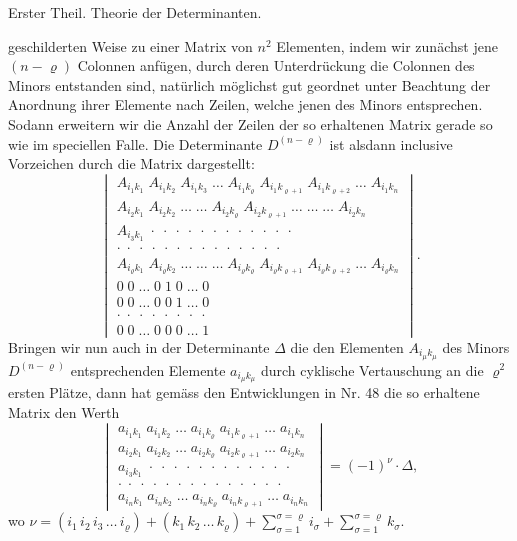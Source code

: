 Erster Theil. Theorie der Determinanten.

geschilderten Weise zu einer Matrix von $n^2$ Elementen, indem wir zunächst jene $(n-\varrho)$ Colonnen anfügen, durch deren Unterdrückung die Colonnen des Minors entstanden sind, natürlich möglichst gut geordnet unter Beachtung der Anordnung ihrer Elemente nach Zeilen, welche jenen des Minors entsprechen. Sodann erweitern wir die Anzahl der Zeilen der so erhaltenen Matrix gerade so wie im speciellen Falle. Die Determinante $D^{(n-\varrho)}$ ist alsdann inclusive Vorzeichen durch die Matrix dargestellt:
\[
\begin{vmatrix}
A_{i_1k_1}\;A_{i_1k_2}\;A_{i_1k_3}\;\ldots\;A_{i_1k_\varrho}\;A_{i_1k_{\varrho+1}}\;A_{i_1k_{\varrho+2}}\;\ldots\;A_{i_1k_n} \\
A_{i_2k_1}\;A_{i_2k_2}\;\ldots\;\ldots\;A_{i_2k_\varrho}\;A_{i_2k_{\varrho+1}}\;\ldots\;\ldots\;\ldots\;A_{i_2k_n} \\
A_{i_3k_1}\;\cdot\;\cdot\;\cdot\;\cdot\;\cdot\;\cdot\;\cdot\;\cdot\;\cdot\;\cdot\;\cdot\;\cdot \\
\cdot\;\cdot\;\cdot\;\cdot\;\cdot\;\cdot\;\cdot\;\cdot\;\cdot\;\cdot\;\cdot\;\cdot\;\cdot\;\cdot \\
A_{i_\varrho k_1}\;A_{i_\varrho k_2}\;\ldots\;\ldots\;\ldots\;A_{i_\varrho k_\varrho}\;A_{i_\varrho k_{\varrho+1}}\;A_{i_\varrho k_{\varrho+2}}\;\ldots\;A_{i_\varrho k_n} \\
0\;0\;\ldots\;0\;1\;0\;\ldots\;0 \\
0\;0\;\ldots\;0\;0\;1\;\ldots\;0 \\
\cdot\;\cdot\;\cdot\;\cdot\;\cdot\;\cdot\;\cdot\;\cdot \\
0\;0\;\ldots\;0\;0\;0\;\ldots\;1
\end{vmatrix}.
\]
Bringen wir nun auch in der Determinante $\Delta$ die den Elementen $A_{i_\mu k_\mu}$ des Minors $D^{(n-\varrho)}$ entsprechenden Elemente $a_{i_\mu k_\mu}$ durch cyklische Vertauschung an die $\varrho^2$ ersten Plätze, dann hat gemäss den Entwicklungen in Nr. 48 die so erhaltene Matrix den Werth
\[
\begin{vmatrix}
a_{i_1k_1}\;a_{i_1k_2}\;\ldots\;a_{i_1k_\varrho}\;a_{i_1k_{\varrho+1}}\;\ldots\;a_{i_1k_n} \\
a_{i_2k_1}\;a_{i_2k_2}\;\ldots\;a_{i_2k_\varrho}\;a_{i_2k_{\varrho+1}}\;\ldots\;a_{i_2k_n} \\
a_{i_3k_1}\;\cdot\;\cdot\;\cdot\;\cdot\;\cdot\;\cdot\;\cdot\;\cdot\;\cdot\;\cdot\;\cdot\;\cdot \\
\cdot\;\cdot\;\cdot\;\cdot\;\cdot\;\cdot\;\cdot\;\cdot\;\cdot\;\cdot\;\cdot\;\cdot\;\cdot\;\cdot \\
a_{i_nk_1}\;a_{i_nk_2}\;\ldots\;a_{i_nk_\varrho}\;a_{i_nk_{\varrho+1}}\;\ldots\;a_{i_nk_n}
\end{vmatrix}
=(-1)^\nu\cdot\Delta,
\]
wo $\nu=(i_1\,i_2\,i_3\,\ldots\,i_\varrho)+(k_1\,k_2\,\ldots\,k_\varrho)+\displaystyle\sum_{\sigma=1}^{\sigma=\varrho}i_\sigma+\sum_{\sigma=1}^{\sigma=\varrho}k_\sigma.$

